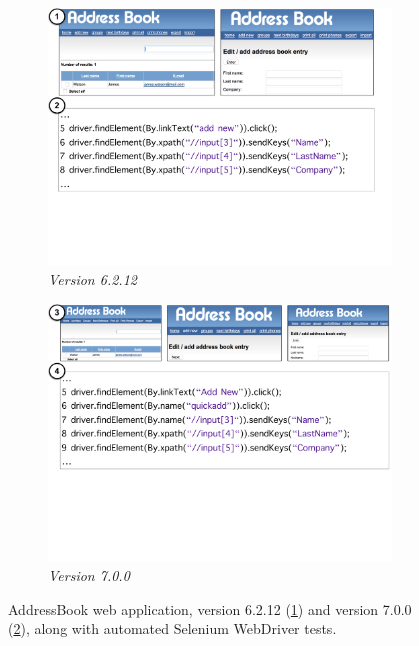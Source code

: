 \begin{figure}[t]
\centering
\begin{subfigure}{\columnwidth}
\centering
\includegraphics[trim=0cm 7.5cm 1.8cm 0cm, clip=true, scale=0.23]{images/addressbook-version1.pdf}
\caption{\emph{Version 6.2.12}}
\label{fig:ab1} 
\end{subfigure}
\begin{subfigure}{\columnwidth}
\centering
\includegraphics[trim=0cm 9.5cm 0cm 0cm, clip=true,  scale=0.260]{images/addressbook-version2.pdf}
\caption{\emph{Version 7.0.0}}
\label{fig:ab2} 
\end{subfigure}
\caption{AddressBook web application, version 6.2.12 (\ref{fig:ab1}) and version 7.0.0 (\ref{fig:ab2}), along with  automated Selenium WebDriver tests. } 
\label{fig:example} 
\end{figure}

